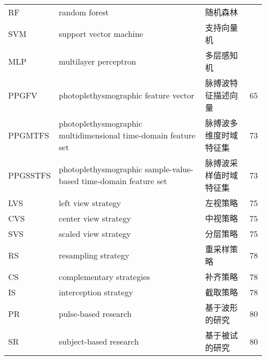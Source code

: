 \begin{center}
\begin{longtable}{m{2cm}m{7cm}m{5cm}m{1cm}<{\centering}}
        
        RF&random forest&随机森林\\
        SVM&support vector machine&支持向量机\\
        MLP&multilayer perceptron&多层感知机\\
        PPGFV &photoplethysmographic feature vector&  脉搏波特征描述向量 & 65\\
        PPGMTFS &     photoplethysmographic multidimensional time-domain feature set & 脉搏波多维度时域特征集 & 73 \\
        PPGSSTFS &     photoplethysmographic sample-value-based time-domain feature set & 脉搏波采样值时域特征集 & 73 \\
        
        LVS & left view strategy & 左视策略 & 75 \\
        CVS & center view strategy & 中视策略 & 75 \\
        SVS & scaled view strategy & 分层策略 & 75 \\
        RS & resampling strategy & 重采样策略 & 78 \\
        CS & complementary strategies & 补齐策略 & 78 \\
        IS & interception strategy & 截取策略 & 78 \\
        PR & pulse-based research & 基于波形的研究 & 80 \\
        SR & subject-based research &基于被试的研究 & 80 \\


\end{longtable}
\end{center}
